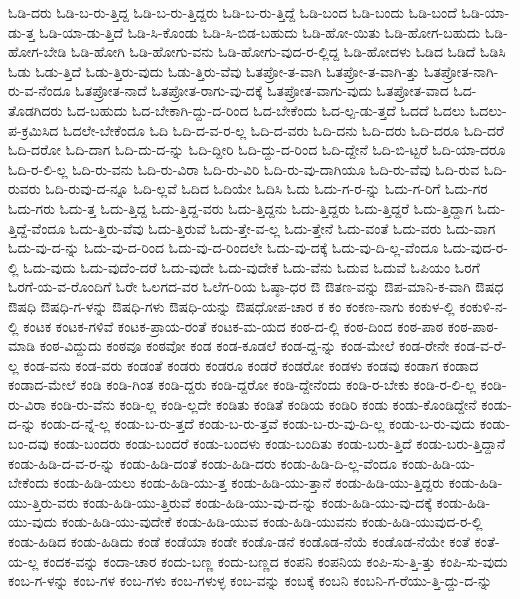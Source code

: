 {ಓಡಿ-ದರು
ಓಡಿ-ಬ-ರು-ತ್ತಿದ್ದ
ಓಡಿ-ಬ-ರು-ತ್ತಿದ್ದರು
ಓಡಿ-ಬ-ರು-ತ್ತಿದ್ದೆ
ಓಡಿ-ಬಂದ
ಓಡಿ-ಬಂದು
ಓಡಿ-ಬಂದೆ
ಓಡಿ-ಯಾ-ಡು-ತ್ತ
ಓಡಿ-ಯಾ-ಡು-ತ್ತಿದೆ
ಓಡಿ-ಸಿ-ಕೊಂಡು
ಓಡಿ-ಸಿ-ಬಿಡ-ಬಹುದು
ಓಡಿ-ಹೋ-ಯಿತು
ಓಡಿ-ಹೋಗ-ಬಹುದು
ಓಡಿ-ಹೋಗ-ಬೇಡಿ
ಓಡಿ-ಹೋಗಿ
ಓಡಿ-ಹೋಗು-ವನು
ಓಡಿ-ಹೋಗು-ವುದ-ರ-ಲ್ಲಿದ್ದ
ಓಡಿ-ಹೋದಳು
ಓಡಿದ
ಓಡಿದೆ
ಓಡಿಸಿ
ಓಡು
ಓಡು-ತ್ತಿದೆ
ಓಡು-ತ್ತಿರು-ವುದು
ಓಡು-ತ್ತಿರು-ವೆವು
ಓತಪ್ರೋ-ತ-ವಾಗಿ
ಓತಪ್ರೋ-ತ-ವಾಗಿ-ತ್ತು
ಓತಪ್ರೋತ-ನಾಗಿ-ರು-ವ-ನೆಂದೂ
ಓತಪ್ರೋತ-ನಾದೆ
ಓತಪ್ರೋತ-ರಾಗು-ವು-ದಕ್ಕೆ
ಓತಪ್ರೋತ-ವಾಗು-ವುದು
ಓತಪ್ರೋತ-ವಾದ
ಓದ-ತೊಡಗಿದರು
ಓದ-ಬಹುದು
ಓದ-ಬೇಕಾಗಿ-ದ್ದು-ದ-ರಿಂದ
ಓದ-ಬೇಕೆಂದು
ಓದ-ಲ್ಪ-ಡು-ತ್ತದೆ
ಓದದೆ
ಓದಲು
ಓದಲು-ಪ-ಕ್ರಮಿಸಿದ
ಓದಲೇ-ಬೇಕೆಂದೂ
ಓದಿ
ಓದಿ-ದ-ವ-ರ-ಲ್ಲ
ಓದಿ-ದ-ವರು
ಓದಿ-ದನು
ಓದಿ-ದರು
ಓದಿ-ದರೂ
ಓದಿ-ದರೆ
ಓದಿ-ದರೋ
ಓದಿ-ದಾಗ
ಓದಿ-ದು-ದ-ನ್ನು
ಓದಿ-ದ್ದೀರಿ
ಓದಿ-ದ್ದು-ದ-ರಿಂದ
ಓದಿ-ದ್ದೇನೆ
ಓದಿ-ಬಿ-ಟ್ಟರೆ
ಓದಿ-ಯಾ-ದರೂ
ಓದಿ-ರ-ಲಿ-ಲ್ಲ
ಓದಿ-ರು-ವನು
ಓದಿ-ರು-ವಿರಾ
ಓದಿ-ರು-ವಿರಿ
ಓದಿ-ರು-ವು-ದಾಗಿಯೂ
ಓದಿ-ರು-ವೆವು
ಓದಿ-ರುವ
ಓದಿ-ರುವರು
ಓದಿ-ರುವು-ದ-ನ್ನೂ
ಓದಿ-ಲ್ಲವೆ
ಓದಿದ
ಓದಿಯೇ
ಓದಿಸಿ
ಓದು
ಓದು-ಗ-ರ-ನ್ನು
ಓದು-ಗ-ರಿಗೆ
ಓದು-ಗರ
ಓದು-ಗರು
ಓದು-ತ್ತ
ಓದು-ತ್ತಿದ್ದ
ಓದು-ತ್ತಿದ್ದ-ವರು
ಓದು-ತ್ತಿದ್ದನು
ಓದು-ತ್ತಿದ್ದರು
ಓದು-ತ್ತಿದ್ದರೆ
ಓದು-ತ್ತಿದ್ದಾಗ
ಓದು-ತ್ತಿದ್ದೆ-ವೆಂದೂ
ಓದು-ತ್ತಿರು-ವೆವು
ಓದು-ತ್ತಿರುವೆ
ಓದು-ತ್ತೇ-ವ-ಲ್ಲ
ಓದು-ತ್ತೇನೆ
ಓದು-ವಂತೆ
ಓದು-ವರು
ಓದು-ವಾಗ
ಓದು-ವು-ದ-ನ್ನು
ಓದು-ವು-ದ-ರಿಂದ
ಓದು-ವು-ದ-ರಿಂದಲೇ
ಓದು-ವು-ದಕ್ಕೆ
ಓದು-ವು-ದಿ-ಲ್ಲ-ವೆಂದೂ
ಓದು-ವುದ-ರ-ಲ್ಲಿ
ಓದು-ವುದು
ಓದು-ವುದೆಂ-ದರೆ
ಓದು-ವುದೇ
ಓದು-ವುದೇಕೆ
ಓದು-ವೆನು
ಓದುವ
ಓದುವೆ
ಓಪಿಯಂ
ಓರಗೆ
ಓರಗೆ-ಯ-ವ-ರೊಂದಿಗೆ
ಓರೇ
ಓಲಗದ-ವರ
ಓಲೆಗ-ರಿಯ
ಓಷ್ಠಾ-ಧರ
ಔ
ಔತಣ-ವನ್ನು
ಔಪ-ಮಾನಿ-ಕ-ವಾಗಿ
ಔಷಧ
ಔಷಧಿ
ಔಷಧಿ-ಗ-ಳನ್ನು
ಔಷಧಿ-ಗಳು
ಔಷಧಿ-ಯನ್ನು
ಔಷಧೋಪ-ಚಾರ
ಕ
ಕಂ
ಕಂಕಣ-ನಾಗು
ಕಂಕುಳ-ಲ್ಲಿ
ಕಂಕುಳಿ-ನ-ಲ್ಲಿ
ಕಂಟಕ
ಕಂಟಕ-ಗಳಿವೆ
ಕಂಟಕ-ಪ್ರಾಯ-ರಂತೆ
ಕಂಟಕ-ಮ-ಯದ
ಕಂಠ-ದ-ಲ್ಲಿ
ಕಂಠ-ದಿಂದ
ಕಂಠ-ಪಾಠ
ಕಂಠ-ಪಾಠ-ಮಾಡಿ
ಕಂಠ-ವಿದ್ದುದು
ಕಂಠವೂ
ಕಂಠವೋ
ಕಂಡ
ಕಂಡ-ಕೂಡಲೆ
ಕಂಡ-ದ್ದ-ನ್ನು
ಕಂಡ-ಮೇಲೆ
ಕಂಡ-ರೇನೇ
ಕಂಡ-ವ-ರೆ-ಲ್ಲ
ಕಂಡ-ವನು
ಕಂಡ-ವರು
ಕಂಡಂತೆ
ಕಂಡರು
ಕಂಡರೂ
ಕಂಡರೆ
ಕಂಡರೋ
ಕಂಡಳು
ಕಂಡವು
ಕಂಡಾಗ
ಕಂಡಾದ
ಕಂಡಾದ-ಮೇಲೆ
ಕಂಡಿ
ಕಂಡಿ-ಗಿಂತ
ಕಂಡಿ-ದ್ದರು
ಕಂಡಿ-ದ್ದರೋ
ಕಂಡಿ-ದ್ದೇನೆಂದು
ಕಂಡಿ-ರ-ಬೇಕು
ಕಂಡಿ-ರ-ಲಿ-ಲ್ಲ
ಕಂಡಿ-ರು-ವಿರಾ
ಕಂಡಿ-ರು-ವೆನು
ಕಂಡಿ-ಲ್ಲ
ಕಂಡಿ-ಲ್ಲದೇ
ಕಂಡಿತು
ಕಂಡಿತೆ
ಕಂಡಿಯ
ಕಂಡಿರಿ
ಕಂಡು
ಕಂಡು-ಕೊಂಡಿದ್ದೇನೆ
ಕಂಡು-ದ-ನ್ನು
ಕಂಡು-ದ-ನ್ನೆ-ಲ್ಲ
ಕಂಡು-ಬ-ರು-ತ್ತದೆ
ಕಂಡು-ಬ-ರು-ತ್ತವೆ
ಕಂಡು-ಬ-ರು-ವು-ದಿ-ಲ್ಲ
ಕಂಡು-ಬ-ರು-ವುದು
ಕಂಡು-ಬಂ-ದವು
ಕಂಡು-ಬಂದರು
ಕಂಡು-ಬಂದರೆ
ಕಂಡು-ಬಂದಳು
ಕಂಡು-ಬಂದಿತು
ಕಂಡು-ಬರು-ತ್ತಿದೆ
ಕಂಡು-ಬರು-ತ್ತಿದ್ದಾನೆ
ಕಂಡು-ಹಿಡಿ-ದ-ವ-ರ-ನ್ನು
ಕಂಡು-ಹಿಡಿ-ದಂತೆ
ಕಂಡು-ಹಿಡಿ-ದರು
ಕಂಡು-ಹಿಡಿ-ದಿ-ಲ್ಲ-ವೆಂದೂ
ಕಂಡು-ಹಿಡಿ-ಯ-ಬೇಕೆಂದು
ಕಂಡು-ಹಿಡಿ-ಯಲು
ಕಂಡು-ಹಿಡಿ-ಯು-ತ್ತ
ಕಂಡು-ಹಿಡಿ-ಯು-ತ್ತಾನೆ
ಕಂಡು-ಹಿಡಿ-ಯು-ತ್ತಿದ್ದರು
ಕಂಡು-ಹಿಡಿ-ಯು-ತ್ತಿರು-ವರು
ಕಂಡು-ಹಿಡಿ-ಯು-ತ್ತಿರುವೆ
ಕಂಡು-ಹಿಡಿ-ಯು-ವು-ದ-ನ್ನು
ಕಂಡು-ಹಿಡಿ-ಯು-ವು-ದಕ್ಕೆ
ಕಂಡು-ಹಿಡಿ-ಯು-ವುದು
ಕಂಡು-ಹಿಡಿ-ಯು-ವುದೇಕೆ
ಕಂಡು-ಹಿಡಿ-ಯುವ
ಕಂಡು-ಹಿಡಿ-ಯುವನು
ಕಂಡು-ಹಿಡಿ-ಯುವುದ-ರ-ಲ್ಲಿ
ಕಂಡು-ಹಿಡಿದ
ಕಂಡು-ಹಿಡಿದು
ಕಂಡೆ
ಕಂಡೆಯಾ
ಕಂಡೇ
ಕಂಡೊ-ಡನೆ
ಕಂಡೊಡ-ನೆಯೆ
ಕಂಡೊಡ-ನೆಯೇ
ಕಂತೆ
ಕಂತೆ-ಯ-ಲ್ಲ
ಕಂದಕ-ವನ್ನು
ಕಂದಾ-ಚಾರ
ಕಂದು-ಬಣ್ಣ
ಕಂದು-ಬಣ್ಣದ
ಕಂಪನಿ
ಕಂಪನಿಯ
ಕಂಪಿ-ಸು-ತ್ತಿ-ತ್ತು
ಕಂಪಿ-ಸು-ವುದು
ಕಂಬ-ಗ-ಳನ್ನು
ಕಂಬ-ಗಳ
ಕಂಬ-ಗಳು
ಕಂಬ-ಗಳುಳ್ಳ
ಕಂಬ-ವನ್ನು
ಕಂಬಕ್ಕೆ
ಕಂಬನಿ
ಕಂಬನಿ-ಗ-ರೆಯು-ತ್ತಿ-ದ್ದು-ದ-ನ್ನು
}
